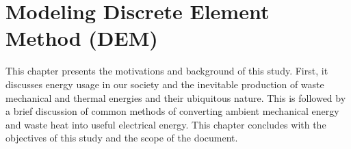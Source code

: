\chapter{Modeling Discrete Element Method (DEM)} \label{sec:modeling-dem}
This chapter presents the motivations and background of this study. First, it discusses energy usage in our society and the inevitable production of waste mechanical and thermal energies and their ubiquitous nature. This is followed by a brief discussion of common methods of converting ambient mechanical energy and waste heat into useful electrical energy. This chapter concludes with the objectives of this study and the scope of the document.










